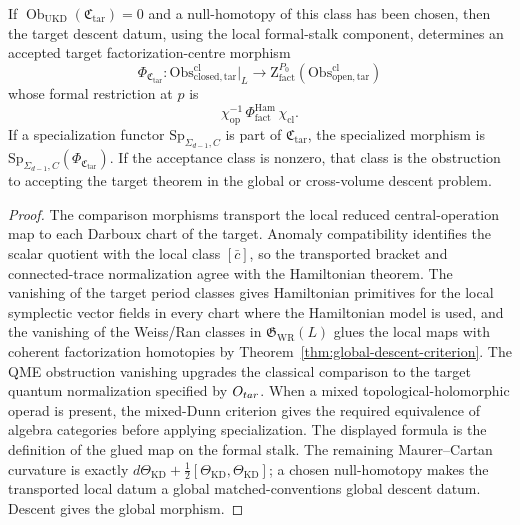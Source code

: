 \begin{thm}
  If \(\operatorname{Ob}_{\mathrm{UKD}}(\mathfrak C_{\mathrm{tar}})=0\)
  and a null-homotopy of this class has been chosen, then the target
  descent datum, using the local formal-stalk component, determines an
  accepted target factorization-centre morphism
  \[
    \Phi_{\mathfrak C_{\mathrm{tar}}}\colon
    \mathrm{Obs}^{\mathrm{cl}}_{\mathrm{closed},\mathrm{tar}}\big|_L
      \longrightarrow
    \mathrm Z^{P_0}_{\mathrm{fact}}
      (\mathrm{Obs}^{\mathrm{cl}}_{\mathrm{open},\mathrm{tar}})
  \]
  whose formal restriction at \(p\) is
  \[
    \chi_{\mathrm{op}}^{-1}\,
    \Phi^{\mathrm{Ham}}_{\mathrm{fact}}\,
    \chi_{\mathrm{cl}}.
  \]
  If a specialization functor
  \(\mathrm{Sp}_{\Sigma_{d-1},C}\) is part of
  \(\mathfrak C_{\mathrm{tar}}\), the specialized morphism is
  \(\mathrm{Sp}_{\Sigma_{d-1},C}(\Phi_{\mathfrak C_{\mathrm{tar}}})\).
  If the acceptance class is nonzero, that class is the obstruction to
  accepting the target theorem in the global or cross-volume descent problem.
\end{thm}

\begin{proof}
  The comparison morphisms transport the local reduced central-operation map to each
  Darboux chart of the target.  Anomaly compatibility identifies the scalar
  quotient with the local class \([\bar c]\), so the transported bracket and
  connected-trace normalization agree with the Hamiltonian theorem.  The
  vanishing of the target period classes gives Hamiltonian primitives for
  the local symplectic vector fields in every chart where the Hamiltonian
  model is used, and the vanishing of the Weiss/Ran classes in
  \(\mathfrak G_{\mathrm{WR}}(L)\) glues the local maps with coherent
  factorization homotopies by
  Theorem~\ref{thm:global-descent-criterion}.  The QME obstruction
  vanishing upgrades the classical comparison to the target quantum
  normalization specified by \(O_{tar}\).  When a mixed
  topological-holomorphic operad is present, the mixed-Dunn criterion gives
  the required equivalence of algebra categories before applying
  specialization.  The displayed formula is the definition of the glued map
  on the formal stalk.  The remaining Maurer--Cartan curvature is exactly
  \(d\Theta_{\mathrm{KD}}+\frac12[\Theta_{\mathrm{KD}},\Theta_{\mathrm{KD}}]\);
  a chosen null-homotopy makes the transported local datum a global
  matched-conventions global descent datum.  Descent gives the global morphism.
\end{proof}

